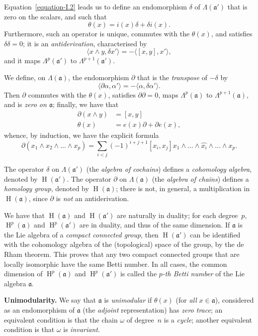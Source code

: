 \documentclass{article}
\newcommand{\fk}{\mathfrak}
\DeclareMathOperator{\HH}{H}
\newcommand{\oldpage}[1]{\marginpar{\footnotesize$\Big\vert$ \textit{p.~#1}}}
\begin{document}
Equation~\cref{equation-I.2} leads us to define an endomorphism $\delta$ of $\Lambda(\fk{a}')$ that is zero on the scalars, and such that
\[
\label{equation-I.4}
  \theta(x) = i(x)\delta + \delta i(x).
\tag{4}
\]
Furthermore, such an operator is unique, commutes with the $\theta(x)$, and satisfies $\delta\delta=0$;
it is an \emph{antiderivation}, characterised by
\[
  \langle x\wedge y,\delta x'\rangle
  = -\langle[x,y],x'\rangle,
\]
and it maps $\Lambda^p(\fk{a}')$ to $\Lambda^{p+1}(\fk{a}')$.

We define, on $\Lambda(\fk{a})$, the endomorphism $\partial$ that is the \emph{transpose} of $-\delta$ by
\[
  \langle\partial\alpha,\alpha'\rangle
  = -\langle\alpha,\delta\alpha'\rangle.
\]
Then $\partial$ commutes with the $\theta(x)$, satisfies $\partial\partial=0$, maps $\Lambda^p(\fk{a})$ to $\Lambda^{p+1}(\fk{a})$, and is \emph{zero on $\fk{a}$};
finally, we have that
\[
  \begin{aligned}
    \partial(x\wedge y)
    &= [x,y]
  \\\theta(x)
    &= e(x)\partial + \partial e(x),
  \end{aligned}
\]
whence, by induction, we have the explicit formula
\[
  \partial(x_1\wedge x_2\wedge\ldots\wedge x_p)
  = \sum_{i<j} (-1)^{i+j+1} [x_i,x_j] x_1\wedge\ldots\wedge\widehat{x_i}\wedge\ldots\wedge x_p.
\]

The operator $\delta$ on $\Lambda(\fk{a}')$ (the \emph{algebra of cochains}) defines a \emph{cohomology algebra}, denoted by $\HH(\fk{a}')$.
The operator $\partial$ on $\Lambda(\fk{a})$ (the \emph{algebra of chains}) defines a \emph{homology group}, denoted by $\HH(\fk{a})$;
there is not, in general, a multiplication in $\HH(\fk{a})$, since $\partial$ is \emph{not} an antiderivation.

We have that $\HH(\fk{a})$ and $\HH(\fk{a}')$ are naturally in duality;
for each degree~$p$, $\HH^p(\fk{a})$ and $\HH^p(\fk{a}')$ are in duality, and thus of the same dimension.
If $\fk{a}$ is the Lie algebra of a \emph{compact connected group}, then $\HH(\fk{a}')$ can be identified with the cohomology algebra of the (topological) space of the group, by the de Rham theorem.
This proves that
\oldpage{12}
any two compact connected groups that are locally isomorphic have the same Betti number.
In all cases, the common dimension of $\HH^p(\fk{a})$ and $\HH^p(\fk{a}')$ is called the \emph{$p$-th Betti number} of the Lie algebra $\fk{a}$.

\medskip
\textbf{Unimodularity.}
We say that $\fk{a}$ is \emph{unimodular} if $\theta(x)$ (for \emph{all} $x\in\fk{a}$), considered as an endomorphism of $\fk{a}$ (the \emph{adjoint} representation) has \emph{zero trace};
an equivalent condition is that the chain $\omega$ of degree~$n$ is a \emph{cycle};
another equivalent condition is that $\omega$ is \emph{invariant}.
\end{document}
